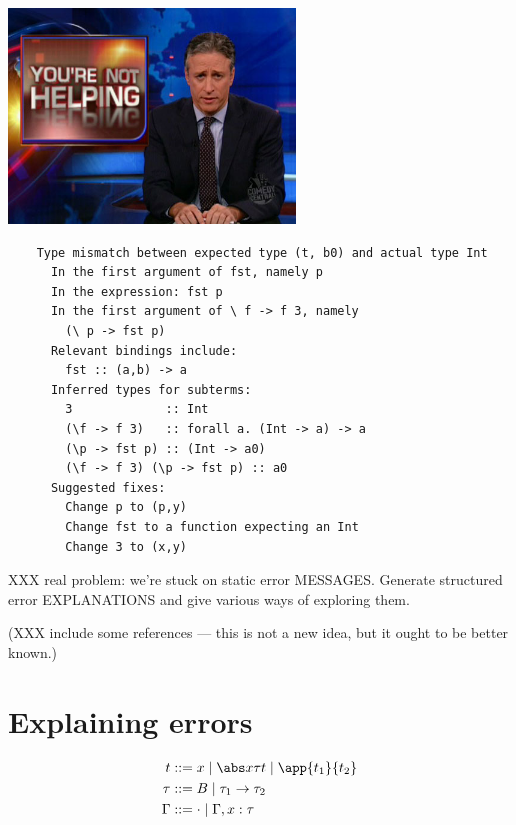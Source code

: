 \documentclass[xcolor=svgnames,12pt,aspectratio=169]{beamer}
\newenvironment{xframe}[1][]
  {\begin{frame}[fragile,environment=xframe,#1]}
  {\end{frame}}
\begin{document}
\begin{xframe}{}
  \begin{center}
    \includegraphics[width=3in]{not-helping.jpg}
  \end{center}
\end{xframe}

\begin{xframe}
  \footnotesize
  \begin{verbatim}
    Type mismatch between expected type (t, b0) and actual type Int
      In the first argument of fst, namely p
      In the expression: fst p
      In the first argument of \ f -> f 3, namely
        (\ p -> fst p)
      Relevant bindings include:
        fst :: (a,b) -> a
      Inferred types for subterms:
        3             :: Int
        (\f -> f 3)   :: forall a. (Int -> a) -> a
        (\p -> fst p) :: (Int -> a0)
        (\f -> f 3) (\p -> fst p) :: a0
      Suggested fixes:
        Change p to (p,y)
        Change fst to a function expecting an Int
        Change 3 to (x,y)
  \end{verbatim}
\end{xframe}

\begin{xframe}{}
  XXX real problem: we're stuck on static error MESSAGES.
  Generate structured error EXPLANATIONS and give various ways of
  exploring them.

  (XXX include some references --- this is not a new idea, but it
  ought to be better known.)
\end{xframe}

\section{Explaining errors}

\begin{xframe}{}
\begin{align*}
  t &::= x \mid \abs x \tau t \mid \app{t_1}{t_2} \\
  \tau &::= B \mid \tau_1 \to \tau_2 \\
  \Gamma &::= \cdot \mid \Gamma,x:\tau
\end{align*}
\end{xframe}
\end{document}
